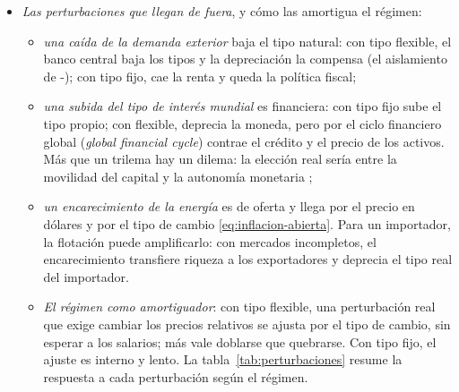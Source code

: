 \documentclass[11pt]{article}
\begin{document}
\begin{itemize}
\begin{itemize}
  \item \emph{el tipo de cambio se aprecia}, en términos nominales (por la paridad de intereses) y reales, y caen las exportaciones netas: como en -- y al revés que en el modelo de  y , donde la expansión fiscal deprecia la moneda por la demanda de dinero;
  \item \emph{el consumo cae}, por el efecto riqueza de los impuestos, pero menos que en la economía cerrada, porque la apreciación abarata lo importado; y la inflación de consumo baja;
  \item \emph{con tipo fijo}, el tipo de interés no puede subir y la expansión fiscal es mucho más potente: el multiplicador es de unos 0,9, frente a unos 0,35~con tipo flexible, a costa de más inflación interna ($E_2$). El resultado de - sobrevive, pero ahora como cuestión de grado.
  \end{itemize}
\item \emph{Las perturbaciones que llegan de fuera}, y cómo las amortigua el régimen:
  \begin{itemize}
  \item \emph{una caída de la demanda exterior} baja el tipo natural: con tipo flexible, el banco central baja los tipos y la depreciación la compensa (el aislamiento de -); con tipo fijo, cae la renta y queda la política fiscal;
  \item \emph{una subida del tipo de interés mundial} es financiera: con tipo fijo sube el tipo propio; con flexible, deprecia la moneda, pero por el ciclo financiero global (\emph{global financial cycle}) contrae el crédito y el precio de los activos. Más que un trilema hay un dilema: la elección real sería entre la movilidad del capital y la autonomía monetaria\nocite{Rey2013Dilema,MirandaAgrippinoRey2020} ;
  \item \emph{un encarecimiento de la energía} es de oferta y llega por el precio en dólares y por el tipo de cambio \eqref{eq:inflacion-abierta}. Para un importador, la flotación puede amplificarlo: con mercados incompletos, el encarecimiento transfiere riqueza a los exportadores y deprecia el tipo real del importador\nocite{BodensteinErcegGuerrieri2011}.
  \item \emph{El régimen como amortiguador}: con tipo flexible, una perturbación real que exige cambiar los precios relativos se ajusta por el tipo de cambio, sin esperar a los salarios\nocite{Friedman1953Case}; más vale doblarse que quebrarse. Con tipo fijo, el ajuste es interno y lento. La tabla~\ref{tab:perturbaciones} resume la respuesta a cada perturbación según el régimen.
  \end{itemize}
\end{itemize}
\end{document}
